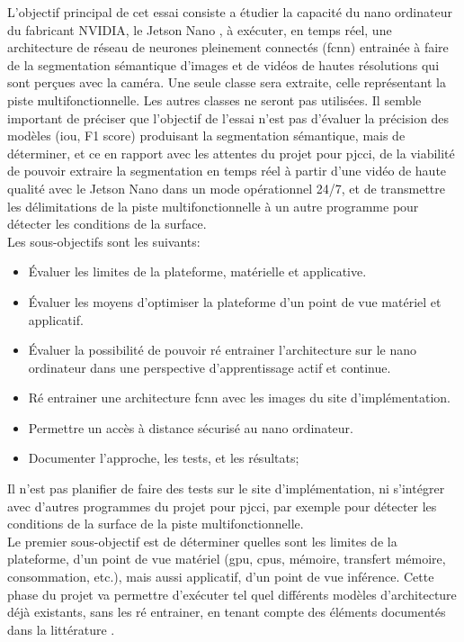 ﻿\noindent L'objectif principal de cet essai consiste a étudier la capacité du nano ordinateur du fabricant NVIDIA, le Jetson Nano \parencite{nvidia_jetson_2019}, à exécuter, en temps réel, une architecture de réseau de neurones pleinement connectés (\acrshort{fcnn}) entrainée à faire de la segmentation sémantique d'images et de vidéos de hautes résolutions qui sont perçues avec la caméra. Une seule classe sera extraite, celle représentant la piste multifonctionnelle. Les autres classes ne seront pas utilisées. Il semble important de préciser que l'objectif de l'essai n'est pas d'évaluer la précision des modèles (\acrshort{iou},  F1 score) produisant la segmentation sémantique, mais de déterminer, et ce en rapport avec les attentes du projet pour \acrshort{pjcci}, de la viabilité de pouvoir extraire la segmentation en temps réel à partir d'une vidéo de haute qualité avec le Jetson Nano dans un mode opérationnel 24/7, et de transmettre les délimitations de la piste multifonctionnelle à un autre programme pour détecter les conditions de la surface.
\vspace{\baselineskip}
\\
\noindent Les sous-objectifs sont les suivants: 
\begin{itemize}
   \item Évaluer les limites de la plateforme, matérielle et applicative.
   \item Évaluer les moyens d'optimiser la plateforme d'un point de vue matériel et applicatif. 
   \item Évaluer la possibilité de pouvoir ré entrainer l'architecture sur le nano ordinateur dans une perspective d'apprentissage actif et continue.
   \item Ré entrainer une architecture \acrshort{fcnn} avec les images du site d'implémentation.
   \item Permettre un accès à distance sécurisé au nano ordinateur.
   \item Documenter l'approche, les tests, et les résultats;
\end{itemize}
\vspace{\baselineskip}
\noindent Il n'est pas planifier de faire des tests sur le site d'implémentation, ni s'intégrer avec d'autres programmes du projet pour \acrshort{pjcci}, par exemple pour détecter les conditions de la surface de la piste multifonctionnelle. 
\vspace{\baselineskip}
\\
\noindent Le premier sous-objectif est de déterminer quelles sont les limites de la plateforme, d'un point de vue matériel (\acrshort{gpu}, \acrshort{cpu}s, mémoire, transfert mémoire, consommation, etc.), mais aussi applicatif, d'un point de vue inférence. Cette phase du projet va permettre d'exécuter tel quel différents modèles d'architecture déjà existants, sans les ré entrainer, en tenant compte des éléments documentés dans la littérature \parencite{nguyen_mavnet_2019, zheng_real-time_2020, nvidia_jetson_2019-1}.
